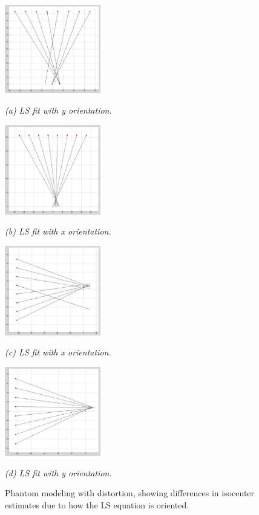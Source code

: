 \begin{figure}[htb]

  \begin{minipage}[b]{0.48\linewidth}
    \centering
    \centerline{\mbox{\includegraphics[width=1.65in]{isocenter/images/simulation/tube_plane_large_error_y.eps}}}
    \centerline{\emph{(a) LS fit with y orientation.}}\medskip
  \end{minipage}
  \hfill
  \begin{minipage}[b]{0.48\linewidth}
    \centering
    \centerline{\mbox{\includegraphics[width=1.65in]{isocenter/images/simulation/tube_plane_small_error_x.eps}}}
    \centerline{\emph{(b) LS fit with x orientation.}}\medskip
  \end{minipage}
  \begin{minipage}[b]{0.48\linewidth}
    \centering
    \centerline{\mbox{\includegraphics[width=1.65in]{isocenter/images/simulation/tube_plane_large_error_x.eps}}}
    \centerline{\emph{(c) LS fit with x orientation.}}\medskip
  \end{minipage}
  \hfill
  \begin{minipage}[b]{0.48\linewidth}
    \centering
    \centerline{\mbox{\includegraphics[width=1.65in]{isocenter/images/simulation/tube_plane_small_error_y.eps}}}
    \centerline{\emph{(d) LS fit with y orientation.}}\medskip
  \end{minipage}
  \caption{Phantom modeling with distortion, showing differences in isocenter estimates due to how the LS equation is oriented.} 
  \label{fig:4}
%
\end{figure}

